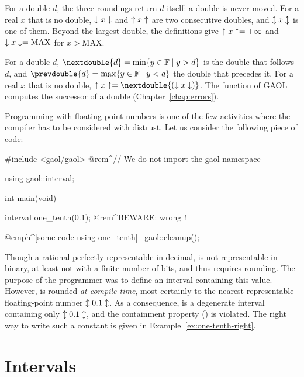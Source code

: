 \documentclass[12pt,a4paper,twoside,openright]{book}
\begin{document}
For a double $d$, the three roundings return $d$ itself: a double is never
moved. For a real $x$ that is no double, $\downarrow x\downarrow$ and $\uparrow x\uparrow$
are two consecutive doubles, and $\updownarrow x\updownarrow$ is one of them. Beyond
the largest double, the definitions give $\uparrow x\uparrow=+\infty$ and
$\downarrow x\downarrow=\mathrm{MAX}$ for $x>\mathrm{MAX}$.

\begin{Def}\label{def:neighbours}
%
For a double $d$, $\nextdouble{d}=\min\{y\in\FSet\mid y>d\}$ is the double
that follows $d$, and $\prevdouble{d}=\max\{y\in\FSet\mid y<d\}$ the double
that precedes it. For a real $x$ that is no double,
$\roundUp{x}=\nextdouble{(\roundDn{x})}$. The function 
of GAOL computes the successor of a double (Chapter~\ref{chap:errors}).
\end{Def}

\begin{Ex}\label{ex:one-tenth}
Programming with floating-point numbers is one of the few activities where
the compiler has to be considered with distrust. Let us consider the
following piece of code:
\begin{example}
#include <gaol/gaol>  @rem^// We do not import the gaol namespace~

using gaol::interval;

int main(void) {
  interval one_tenth(0.1); @rem^BEWARE: wrong !~

  @emph^[some code using one_tenth]~
  gaol::cleanup();
}
\end{example}
Though a rational perfectly representable in decimal,  is not
representable in binary, at least not with a finite number of bits, and
thus requires rounding. The purpose of the programmer was to define an
interval containing this value. However,  is rounded \emph{at
compile time}, most certainly to the nearest representable floating-point
number $\updownarrow0.1\updownarrow$. As a consequence,  is a
degenerate interval containing only $\updownarrow0.1\updownarrow$, and the
containment property () is violated. The right way
to write such a constant is given in Example~\ref{ex:one-tenth-right}.
\end{Ex}

\section{Intervals}\label{sec:intervals}
%
\end{document}
